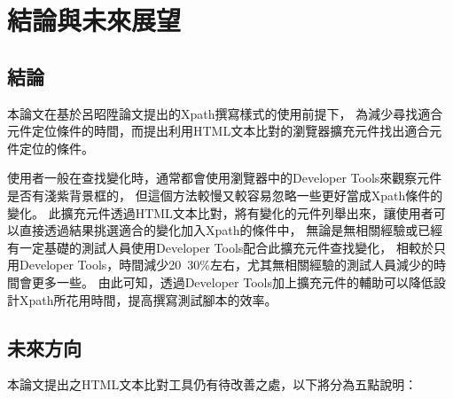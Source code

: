 \chapter{結論與未來展望}
\section{結論}
\indent
本論文在基於呂昭陞論文提出的Xpath撰寫樣式的使用前提下，
為減少尋找適合元件定位條件的時間，而提出利用HTML文本比對的瀏覽器擴充元件找出適合元件定位的條件。

使用者一般在查找變化時，通常都會使用瀏覽器中的Developer Tools來觀察元件是否有淺紫背景框的，
但這個方法較慢又較容易忽略一些更好當成Xpath條件的變化。
此擴充元件透過HTML文本比對，將有變化的元件列舉出來，讓使用者可以直接透過結果挑選適合的變化加入Xpath的條件中，
無論是無相關經驗或已經有一定基礎的測試人員使用Developer Tools配合此擴充元件查找變化，
相較於只用Developer Tools，時間減少20~30\%左右，尤其無相關經驗的測試人員減少的時間會更多一些。
由此可知，透過Developer Tools加上擴充元件的輔助可以降低設計Xpath所花用時間，提高撰寫測試腳本的效率。

\section{未來方向}
\indent
本論文提出之HTML文本比對工具仍有待改善之處，以下將分為五點說明：

